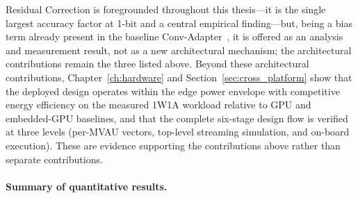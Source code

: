 \documentclass[12pt, a4paper]{report}
\numberwithin{equation}{chapter}
\numberwithin{figure}{chapter}
\numberwithin{table}{chapter}
\numberwithin{algorithm}{chapter}
\begin{document}
Residual Correction is foregrounded throughout this thesis---it is the single largest accuracy factor at 1-bit and a central empirical finding---but, being a bias term already present in the baseline Conv-Adapter~\cite{Chen2024ConvAdapter}, it is offered as an analysis and measurement result, not as a new architectural mechanism; the architectural contributions remain the three listed above. Beyond these architectural contributions, Chapter~\ref{ch:hardware} and Section~\ref{sec:cross_platform} show that the deployed design operates within the edge power envelope with competitive energy efficiency on the measured 1W1A workload relative to GPU and embedded-GPU baselines, and that the complete six-stage design flow is verified at three levels (per-MVAU vectors, top-level streaming simulation, and on-board execution). These are evidence supporting the contributions above rather than separate contributions.

\paragraph{Summary of quantitative results.}
\end{document}
